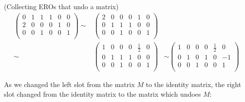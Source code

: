 \begin{example} (Collecting EROs that \hypertarget{undo a matrix}{undo a matrix})
\begin{eqnarray*}
\left(\begin{array}{ccc|ccc}
0 & 1 & 1 &1 &0 &0\\ 
2 & 0 & 0 &0&1&0\\
0& 0 & 1   &0  &0 &1\\
\end{array}  \right)
\sim
&\left(\begin{array}{ccc|ccc}
2 & 0 & 0 &0&1&0\\
0 & 1 & 1 &1 &0 &0\\ 
0& 0 & 1   &0  &0 &1\\
\end{array}  \right)&
\\
\sim
&\left(\begin{array}{ccc|ccc}
1 & 0 & 0 &0&\frac12&0\\
0 & 1 & 1 &1 &0 &0\\ 
0& 0 & 1   &0  &0 &1\\
\end{array}  \right)&
\sim
\left(\begin{array}{ccc|ccc}
1 & 0 & 0 &0&\frac12&0\\
0 & 1 & 0 &1 &0 &-1\\ 
0& 0 & 1   &0  &0 &1\\
\end{array}  \right)
\end{eqnarray*}
\end{example}
\noindent
As we changed the left slot from the matrix $M$ to the identity matrix, the right slot changed from the identity matrix to the matrix which undoes $M$: 
